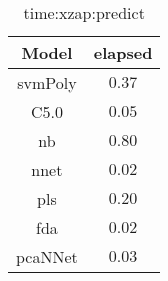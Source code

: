 \begin{table}[!ht]
	\centering
	\begin{tabular}{|c|c|}
		\hline
		Model & elapsed \\ \hline
		svmPoly & $0.37$ \\ \hline
		C5.0 & $0.05$ \\ \hline
		nb & $0.80$ \\ \hline
		nnet & $0.02$ \\ \hline
		pls & $0.20$ \\ \hline
		fda & $0.02$ \\ \hline
		pcaNNet & $0.03$ \\ \hline
	\end{tabular}
	\caption{time:xzap:predict}
	\label{tab:time:xzap:predict}
\end{table}
